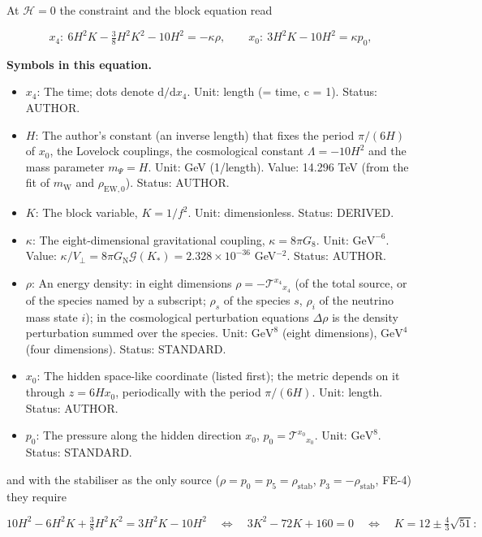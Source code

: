\documentclass[
  10pt,
]{article}
\providecommand{\tightlist}{%
  \setlength{\itemsep}{0pt}\setlength{\parskip}{0pt}}
\begin{document}
At \(\mathcal{H} = 0\) the constraint and the block equation read

\[
x_4:\ 6H^2K - \tfrac38H^2K^2 - 10H^2 = -\kappa\rho,\qquad x_0:\ 3H^2K - 10H^2 = \kappa p_0,
\]

\textbf{Symbols in this equation.}

\begin{itemize}
\tightlist
\item
  \(x_4\): The time; dots denote \(\mathrm{d}/\mathrm{d}x_4\). Unit:
  length (= time, c = 1). Status: AUTHOR.
\item
  \(H\): The author's constant (an inverse length) that fixes the period
  \(\pi/(6H)\) of \(x_0\), the Lovelock couplings, the cosmological
  constant \(\Lambda = -10H^2\) and the mass parameter \(m_\Psi = H\).
  Unit: GeV (1/length). Value: 14.296 TeV (from the fit of
  \(m_{\mathrm{W}}\) and \(\rho_{\mathrm{EW},0}\)). Status: AUTHOR.
\item
  \(K\): The block variable, \(K = 1/f^2\). Unit: dimensionless. Status:
  DERIVED.
\item
  \(\kappa\): The eight-dimensional gravitational coupling,
  \(\kappa = 8\pi G_8\). Unit: \(\mathrm{GeV}^{-6}\). Value:
  \(\kappa/V_\perp = 8\pi G_{\mathrm{N}}\mathcal{G}(K_*) = 2.328\times10^{-36}\)
  GeV\(^{-2}\). Status: AUTHOR.
\item
  \(\rho\): An energy density: in eight dimensions
  \(\rho = -\mathcal{T}^{x_4}{}_{x_4}\) (of the total source, or of the
  species named by a subscript; \(\rho_s\) of the species \(s\),
  \(\rho_i\) of the neutrino mass state \(i\)); in the cosmological
  perturbation equations \(\Delta\rho\) is the density perturbation
  summed over the species. Unit: \(\mathrm{GeV}^{8}\) (eight
  dimensions), \(\mathrm{GeV}^{4}\) (four dimensions). Status: STANDARD.
\item
  \(x_0\): The hidden space-like coordinate (listed first); the metric
  depends on it through \(z = 6Hx_0\), periodically with the period
  \(\pi/(6H)\). Unit: length. Status: AUTHOR.
\item
  \(p_0\): The pressure along the hidden direction \(x_0\),
  \(p_0 = \mathcal{T}^{x_0}{}_{x_0}\). Unit: \(\mathrm{GeV}^{8}\).
  Status: STANDARD.
\end{itemize}

and with the stabiliser as the only source
(\(\rho = p_0 = p_5 = \rho_{\mathrm{stab}}\),
\(p_3 = -\rho_{\mathrm{stab}}\), FE-4) they require

\[
10H^2 - 6H^2K + \tfrac38H^2K^2 = 3H^2K - 10H^2\quad\Leftrightarrow\quad 3K^2 - 72K + 160 = 0\quad\Leftrightarrow\quad
K = 12 \pm \tfrac43\sqrt{51}:
\]
\end{document}
